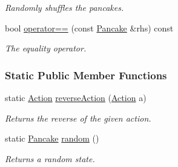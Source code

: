\begin{DoxyCompactItemize}
\begin{DoxyCompactList}\small\item\em Randomly shuffles the pancakes. \end{DoxyCompactList}\item 
bool \hyperlink{structdomain_1_1pancake_1_1Pancake_a84530523caee0e84dc3f691f5b3536a3}{operator==} (const \hyperlink{structdomain_1_1pancake_1_1Pancake}{Pancake} \&rhs) const 
\begin{DoxyCompactList}\small\item\em The equality operator. \end{DoxyCompactList}\end{DoxyCompactItemize}
\subsubsection*{Static Public Member Functions}
\begin{DoxyCompactItemize}
\item 
static \hyperlink{structdomain_1_1pancake_1_1Pancake_a58ceacb6a181cbcdb34169b300957f95}{Action} \hyperlink{structdomain_1_1pancake_1_1Pancake_a6fef9cf51c8756adc506728ea6108373}{reverse\+Action} (\hyperlink{structdomain_1_1pancake_1_1Pancake_a58ceacb6a181cbcdb34169b300957f95}{Action} a)
\begin{DoxyCompactList}\small\item\em Returns the reverse of the given action. \end{DoxyCompactList}\item 
static \hyperlink{structdomain_1_1pancake_1_1Pancake}{Pancake} \hyperlink{structdomain_1_1pancake_1_1Pancake_ad370c66579f3aefca74b3a8da4a710ed}{random} ()
\begin{DoxyCompactList}\small\item\em Returns a random state. \end{DoxyCompactList}\end{DoxyCompactItemize}
